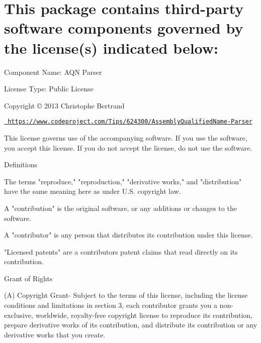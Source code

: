 \chapter{This package contains third-\/party software components governed by the license(s) indicated below\+:}
\hypertarget{md__library_2_package_cache_2com_8unity_8visualscripting_0d1_89_82_2_third_01_party_01_notices}{}\label{md__library_2_package_cache_2com_8unity_8visualscripting_0d1_89_82_2_third_01_party_01_notices}
Component Name\+: AQN Parser

License Type\+:  Public License

Copyright © 2013 Christophe Bertrand

\href{https://www.codeproject.com/Tips/624300/AssemblyQualifiedName-Parser}{\texttt{ https\+://www.\+codeproject.\+com/\+Tips/624300/\+Assembly\+Qualified\+Name-\/\+Parser}}

This license governs use of the accompanying software. If you use the software, you accept this license. If you do not accept the license, do not use the software.


\begin{DoxyEnumerate}
\item Definitions
\end{DoxyEnumerate}

The terms "{}reproduce,"{} "{}reproduction,"{} "{}derivative works,"{} and "{}distribution"{} have the same meaning here as under U.\+S. copyright law.

A "{}contribution"{} is the original software, or any additions or changes to the software.

A "{}contributor"{} is any person that distributes its contribution under this license.

"{}\+Licensed patents"{} are a contributor\textquotesingle{}s patent claims that read directly on its contribution.


\begin{DoxyEnumerate}
\item Grant of Rights
\end{DoxyEnumerate}

(A) Copyright Grant-\/ Subject to the terms of this license, including the license conditions and limitations in section 3, each contributor grants you a non-\/exclusive, worldwide, royalty-\/free copyright license to reproduce its contribution, prepare derivative works of its contribution, and distribute its contribution or any derivative works that you create.

